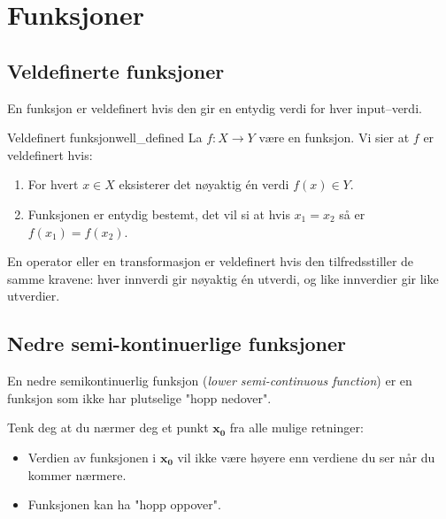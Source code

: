 \section{Funksjoner}
\subsection{Veldefinerte funksjoner}
En funksjon er veldefinert hvis den gir en entydig verdi for hver input--verdi.
\begin{definition}{Veldefinert funksjon}{well_defined}
	La \( f: X \to Y \) være en funksjon. Vi sier at \( f \) er veldefinert hvis:
	\begin{enumerate}
		\item For hvert \( x \in X \) eksisterer det nøyaktig én verdi \( f(x) \in Y \).
		\item Funksjonen er entydig bestemt, det vil si at hvis \( x_1 = x_2 \) så er \( f(x_1) = f(x_2) \).
	\end{enumerate}

	En operator eller en transformasjon er veldefinert hvis den tilfredsstiller de samme kravene: hver innverdi gir nøyaktig én utverdi, og like innverdier gir like utverdier.
\end{definition}

\subsection{Nedre semi-kontinuerlige funksjoner}
En nedre semikontinuerlig funksjon (\textit{lower semi-continuous function}) er en funksjon som ikke har plutselige "hopp nedover".

Tenk deg at du nærmer deg et punkt \( \symbf{x_0} \) fra alle mulige retninger:
\begin{itemize}
	\item Verdien av funksjonen i \( \symbf{x_0} \) vil ikke være høyere enn verdiene du ser når du kommer nærmere.
	\item Funksjonen kan ha "hopp oppover".
\end{itemize}

